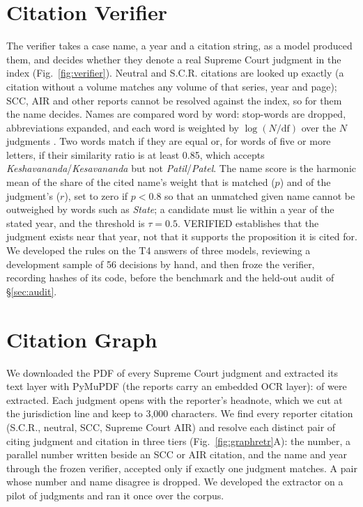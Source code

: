 \section{Citation Verifier}
\label{sec:verifier}
The verifier takes a case name, a year and a citation string, as a model produced them, and decides whether they denote a real Supreme Court judgment in the index (Fig.~\ref{fig:verifier}). Neutral and S.C.R. citations are looked up exactly (a citation without a volume matches any volume of that series, year and page); SCC, AIR and other reports cannot be resolved against the index, so for them the name decides. Names are compared word by word: stop-words are dropped, abbreviations expanded, and each word is weighted by $\log(N/\mathrm{df})$ over the $N$ judgments \cite{sparckjones}. Two words match if they are equal or, for words of five or more letters, if their similarity ratio \cite{difflib} is at least 0.85, which accepts \emph{Keshavananda}/\emph{Kesavananda} but not \emph{Patil}/\emph{Patel}. The name score is the harmonic mean of the share of the cited name's weight that is matched ($p$) and of the judgment's ($r$), set to zero if $p<0.8$ so that an unmatched given name cannot be outweighed by words such as \emph{State}; a candidate must lie within a year of the stated year, and the threshold is $\tau=0.5$. VERIFIED establishes that the judgment exists near that year, not that it supports the proposition it is cited for. We developed the rules on the T4 answers of three models, reviewing a development sample of 56 decisions by hand, and then froze the verifier, recording hashes of its code, before the benchmark and the held-out audit of \S\ref{sec:audit}.



\section{Citation Graph}
\label{sec:graph}
We downloaded the PDF of every Supreme Court judgment and extracted its text layer with PyMuPDF (the reports carry an embedded OCR layer): \GraphTextOK{} of \CorpusSC{} were extracted. Each judgment opens with the reporter's headnote, which we cut at the jurisdiction line and keep to 3{,}000 characters. We find every reporter citation (S.C.R., neutral, SCC, Supreme Court AIR) and resolve each distinct pair of citing judgment and citation in three tiers (Fig.~\ref{fig:graphretr}A): the number, a parallel number written beside an SCC or AIR citation, and the name and year through the frozen verifier, accepted only if exactly one judgment matches. A pair whose number and name disagree is dropped. We developed the extractor on a pilot of \PilotN{} judgments and ran it once over the corpus.

